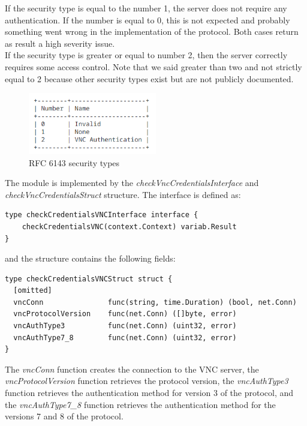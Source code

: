 If the security type is equal to the number 1, the server does not require any authentication. If the number is equal to 0, this is not expected and probably something went wrong in the implementation of the protocol. Both cases return as result a high severity issue. \\
If the security type is greater or equal to number 2, then the server correctly requires some access control. Note that we said greater than two and not strictly equal to 2 because other security types exist but are not publicly documented.

\begin{figure}[h]
  \centering
  \includegraphics[width=0.5\textwidth]{chapters/05/assets/rfc6143-security-types}
  \caption{RFC 6143 security types}
  \label{fig:rfc6143-security-types}
\end{figure}

The module is implemented by the \textit{checkVncCredentialsInterface} and \textit{checkVncCredentialsStruct} structure. The interface is defined as:

\begin{lstlisting}[style=golang]
type checkCredentialsVNCInterface interface {
	checkCredentialsVNC(context.Context) variab.Result
}
\end{lstlisting}

and the structure contains the following fields:

\begin{lstlisting}[style=golang]
type checkCredentialsVNCStruct struct {
  [omitted]
  vncConn               func(string, time.Duration) (bool, net.Conn)
  vncProtocolVersion    func(net.Conn) ([]byte, error)
  vncAuthType3          func(net.Conn) (uint32, error)
  vncAuthType7_8        func(net.Conn) (uint32, error)
}
\end{lstlisting}

The \textit{vncConn} function creates the connection to the VNC server, the \textit{vncProtocolVersion} function retrieves the protocol version, the \textit{vncAuthType3} function retrieves the authentication method for version 3 of the protocol, and the \textit{vncAuthType7\_8} function retrieves the authentication method for the versions 7 and 8 of the protocol.

